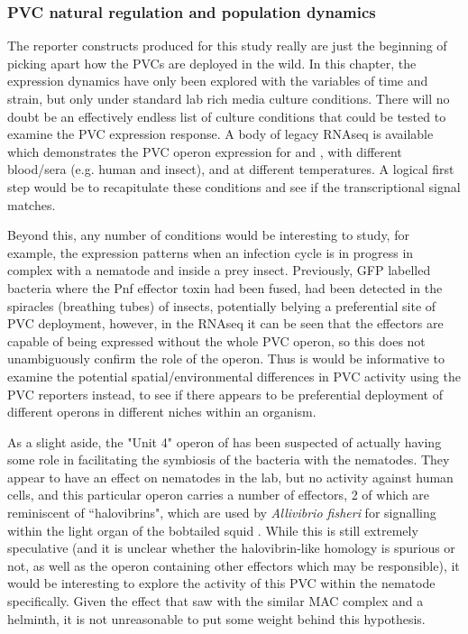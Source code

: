 \subsubsection{PVC natural regulation and population dynamics}
The reporter constructs produced for this study really are just the beginning of picking apart how the PVCs are deployed in the wild. In this chapter, the expression dynamics have only been explored with the variables of time and strain, but only under standard lab rich media culture conditions. There will no doubt be an effectively endless list of culture conditions that could be tested to examine the PVC expression response. A body of legacy RNAseq is available which demonstrates the PVC operon expression for \Pasy{} and \Plum, with different blood/sera (e.g. human and insect), and at different temperatures. A logical first step would be to recapitulate these conditions and see if the transcriptional signal matches.

Beyond this, any number of conditions would be interesting to study, for example, the expression patterns when an infection cycle is in progress in complex with a nematode and inside a prey insect. Previously, GFP labelled bacteria where the Pnf effector toxin had been fused, had been detected in the spiracles (breathing tubes) of insects, potentially belying a preferential site of PVC deployment, however, in the RNAseq it can be seen that the effectors are capable of being expressed without the whole PVC operon, so this does not unambiguously confirm the role of the operon. Thus is would be informative to examine the potential spatial/environmental differences in PVC activity using the PVC reporters instead, to see if there appears to be preferential deployment of different operons in different niches within an organism.

As a slight aside, the "Unit 4" operon of \Plum{} has been suspected of actually having some role in facilitating the symbiosis of the bacteria with the nematodes. They appear to have an effect on nematodes in the lab, but no activity against human cells, and this particular operon carries a number of effectors, 2 of which are reminiscent of ``halovibrins", which are used by \emph{Allivibrio fisheri} for signalling within the light organ of the bobtailed squid \citep{Stabb2001, Reich1996}. While this is still extremely speculative (and it is unclear whether the halovibrin-like homology is spurious or not, as well as the operon containing other effectors which may be responsible), it would be interesting to explore the activity of this PVC within the nematode specifically. Given the effect that \cite{Shikuma2014} saw with the similar MAC complex and a helminth, it is not unreasonable to put some weight behind this hypothesis.

